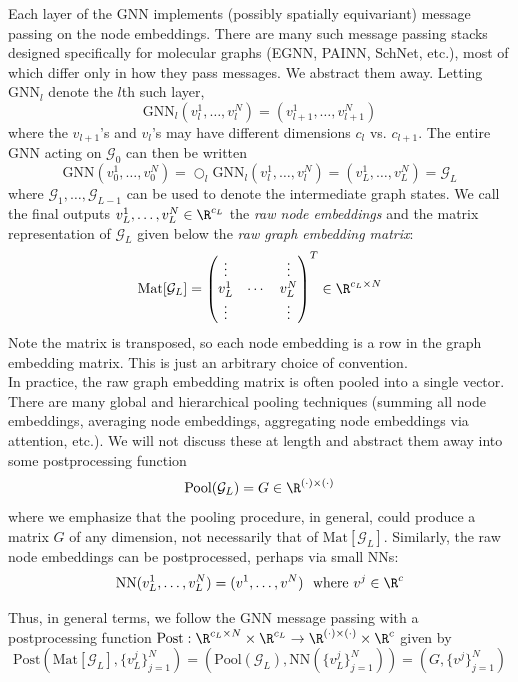 \documentclass[12pt]{article}
\begin{document}
    Each layer of the GNN implements (possibly spatially equivariant) message passing on the node embeddings. There are many such message passing stacks designed specifically for molecular graphs (EGNN, PAINN, SchNet, etc.), most of which differ only in how they pass messages. We abstract them away. Letting $\text{GNN}_l$ denote the $l$th such layer, 
    \[ \text{GNN}_l(v_l^1, \ldots, v_l^N) = (v_{l+1}^1, \ldots, v_{l+1}^N)\]
    where the $v_{l+1}$'s and $v_l$'s may have different dimensions $c_l$ vs. $c_{l+1}$. The entire GNN acting on $\mathcal{G}_0$ can then be written
    \begin{equation}
        \text{GNN}(v_0^1, \ldots, v_0^N) = \bigcirc_l \text{GNN}_l(v_l^1, \ldots, v_l^N) = (v_L^1, \ldots, v_L^N) = \mathcal{G}_L 
    \end{equation}
    where $\mathcal{G}_1, \ldots, \mathcal{G}_{L-1}$ can be used to denote the intermediate graph states. We call the final outputs $v_L^1, \ldots, v_L^N \in \R^{c_L}$ the \textit{raw node embeddings} and the matrix representation of $\mathcal{G}_L$ given below the \textit{raw graph embedding matrix}:
    \[ \text{Mat}[\mathcal{G}_L] = \begin{pmatrix}
        \vdots & & \vdots \\
        v_L^1 & \cdots & v_L^N \\
        \vdots & & \vdots
    \end{pmatrix}^T \in \R^{c_L \times N}\]
    Note the matrix is transposed, so each node embedding is a row in the graph embedding matrix. This is just an arbitrary choice of convention. \\[-6pt]

    In practice, the raw graph embedding matrix is often pooled into a single vector. There are many global and hierarchical pooling techniques (summing all node embeddings, averaging node embeddings, aggregating node embeddings via attention, etc.). We will not discuss these at length and abstract them away into some postprocessing function
    \[ \text{Pool}(\mathcal{G}_L) = G \in \R^{(\cdot) \times (\cdot)}\]
    where we emphasize that the pooling procedure, in general, could produce a matrix $G$ of any dimension, not necessarily that of $\text{Mat}[\mathcal{G}_L]$. Similarly, the raw node embeddings can be postprocessed, perhaps via small NNs:
    \[ \text{NN}(v_L^1, \ldots, v_L^N) = (v^1, \ldots, v^N) \ \  \text{where} \ v^j \in \R^c\]

    Thus, in general terms, we follow the GNN message passing with a postprocessing function $\text{Post}: \R^{c_L \times N} \times \R^{c_L} \to \R^{(\cdot) \times (\cdot)} \times \R^c$ given by
    \[ \text{Post}( \text{Mat}[\mathcal{G}_L], \{v_L^j\}_{j=1}^N) = (\text{Pool}(\mathcal{G}_L), \text{NN}(\{v_L^j\}_{j=1}^N))=(G, \{v^j\}_{j=1}^N)\]
\end{document}
